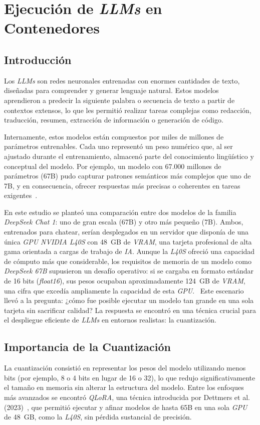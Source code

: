 
\chapter{Ejecución de \textit{LLMs} en Contenedores}

\section{Introducción}
Los \textit{LLMs} son redes neuronales entrenadas con enormes cantidades de texto, diseñadas para comprender y generar lenguaje natural. Estos modelos aprendieron a predecir la siguiente palabra o secuencia de texto a partir de contextos extensos, lo que les permitió realizar tareas complejas como redacción, traducción, resumen, extracción de información o generación de código.

Internamente, estos modelos están compuestos por miles de millones de parámetros entrenables. Cada uno representó un peso numérico que, al ser ajustado durante el entrenamiento, almacenó parte del conocimiento lingüístico y conceptual del modelo. Por ejemplo, un modelo con 67.000 millones de parámetros (67B) pudo capturar patrones semánticos más complejos que uno de 7B, y en consecuencia, ofrecer respuestas más precisas o coherentes en tareas exigentes~\cite{ref26}.

En este estudio se planteó una comparación entre dos modelos de la familia \textit{DeepSeek Chat 1}: uno de gran escala (67B) y otro más pequeño (7B). Ambos, entrenados para chatear, serían desplegados en un servidor que disponía de una única \textit{GPU NVIDIA L40S} con 48~GB de \textit{VRAM}, una tarjeta profesional de alta gama orientada a cargas de trabajo de \textit{IA}.
Aunque la \textit{L40S} ofreció una capacidad de cómputo más que considerable, los requisitos de memoria de un modelo como \textit{DeepSeek 67B} supusieron un desafío operativo: si se cargaba en formato estándar de 16 bits (\textit{float16}), sus pesos ocupaban aproximadamente 124~GB de \textit{VRAM}, una cifra que excedía ampliamente la capacidad de esta \textit{GPU}.~\cite{ref27} Este escenario llevó a la pregunta: ¿cómo fue posible ejecutar un modelo tan grande en una sola tarjeta sin sacrificar calidad? La respuesta se encontró en una técnica crucial para el despliegue eficiente de \textit{LLMs} en entornos realistas: la cuantización.

\section{Importancia de la Cuantización}
La cuantización consistió en representar los pesos del modelo utilizando menos bits (por ejemplo, 8 o 4 bits en lugar de 16 o 32), lo que redujo significativamente el tamaño en memoria sin alterar la estructura del modelo. Entre los enfoques más avanzados se encontró \textit{QLoRA}, una técnica introducida por Dettmers et al. (2023)~\cite{ref28}, que permitió ejecutar y afinar modelos de hasta 65B en una sola \textit{GPU} de 48~GB, como la \textit{L40S}, sin pérdida sustancial de precisión.

